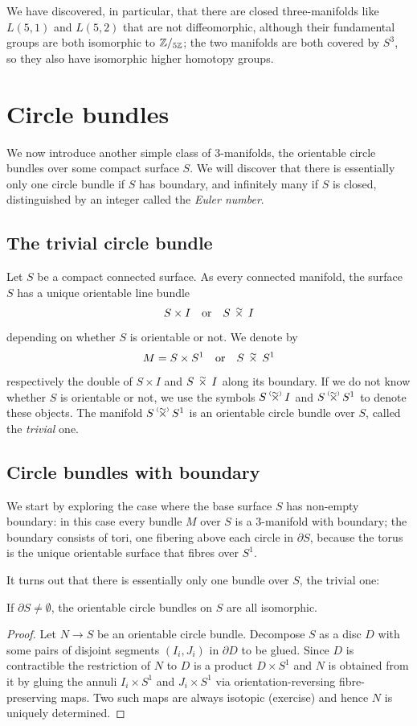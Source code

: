 We have discovered, in particular, that there are closed three-manifolds like $L(5,1)$ and $L(5,2)$ that are not diffeomorphic, although their fundamental groups are both isomorphic to $\mathbb{Z}/_{5\mathbb{Z}}$; the two manifolds are both covered by $S^3$, so they also have isomorphic higher homotopy groups.

\section{Circle bundles}
We now introduce another simple class of 3-manifolds, the orientable circle bundles over some compact surface $S$. We will discover that there is essentially only one circle bundle if $S$ has boundary, and infinitely many if $S$ is closed, distinguished by an integer called the \emph{Euler number}.

\subsection{The trivial circle bundle}
Let $S$ be a compact connected surface. As every connected manifold, the surface $S$ has a unique orientable line bundle
$$S\times I \quad {\rm or} \quad S\timtil I$$ 
depending on whether $S$ is orientable or not. We denote by 
$$M=S\times S^1 \quad {\rm or} \quad S\timtil S^1$$ 
respectively the double of $S\times I$ and $S\timtil I$ along its boundary. If we do not know whether $S$ is orientable or not, we use the symbols $S\timforsetil I$ and $S\timforsetil S^1$ to denote these objects. The manifold $S\timforsetil S^1$ is an orientable circle bundle over $S$, called the \emph{trivial} one. 

\subsection{Circle bundles with boundary}
We start by exploring the case where the base surface $S$ has non-empty boundary: in this case every bundle $M$ over $S$ is a 3-manifold with boundary; the boundary consists of tori, one fibering above each circle in $\partial S$, because the torus is the unique orientable surface that fibres over $S^1$.

It turns out that there is essentially only one bundle over $S$, the trivial one:

\begin{lemma} \label{unique:lemma}
If $\partial S \neq \emptyset$, the orientable circle bundles on $S$ are all isomorphic.
\end{lemma}
\begin{proof}
Let $N\to S$ be an orientable circle bundle. Decompose $S$ as a disc $D$ with some pairs of disjoint segments $(I_i, J_i)$ in $\partial D$ to be glued. Since $D$ is contractible the restriction of $N$ to $D$ is a product $D\times S^1$ and $N$ is obtained from it by gluing the annuli $I_i\times S^1$ and $J_i\times S^1$ via orientation-reversing fibre-preserving maps. Two such maps are always isotopic (exercise) and hence $N$ is uniquely determined.
\end{proof}


